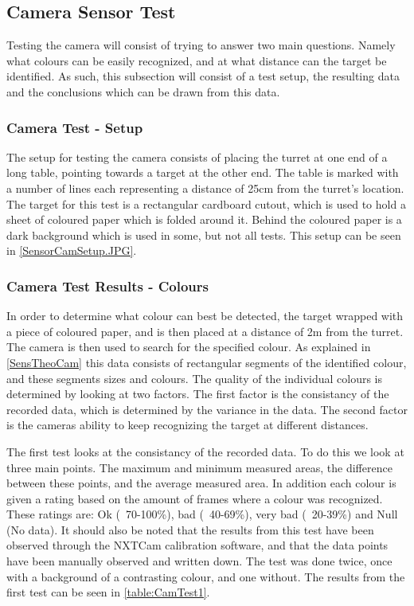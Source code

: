 \subsection{Camera Sensor Test}\label{CamTest}%
Testing the camera will consist of trying to answer two main questions. Namely
what colours can be easily recognized, and at what distance can the target be
identified. As such, this subsection will consist of a test setup, the resulting
data and the conclusions which can be drawn from this data.

\subsubsection{Camera Test - Setup}\label{CamTestSetup}
The setup for testing the camera consists of placing the turret at one end of a
long table, pointing towards a target at the other end. The table is marked with
a number of lines each representing a distance of 25cm from the turret's
location. The target for this test is a rectangular cardboard cutout, which is
used to hold a sheet of coloured paper which is folded around it. Behind the
coloured paper is a dark background which is used in some, but not all tests.
This setup can be seen in \autoref{SensorCamSetup.JPG}.


\subsubsection{Camera Test Results - Colours}\label{CamTestColours}
In order to determine what colour can best be detected, the target wrapped with
a piece of coloured paper, and is then placed at a distance of 2m from the
turret. The camera is then used to search for the specified colour. As explained
in \autoref{SensTheoCam} this data consists of rectangular segments of the
identified colour, and these segments sizes and colours. The quality of the
individual colours is determined by looking at two factors. The first factor is
the consistancy of the recorded data, which is determined by the variance in the
data. The second factor is the cameras ability to keep recognizing the target
at different distances.\nl

The first test looks at the consistancy of the recorded data. To do this we look
at three main points. The maximum and minimum measured areas, the difference
between these points, and the average measured area. In addition each colour is
given a rating based on the amount of frames where a colour was recognized.
These ratings are: Ok (~70-100\%), bad (~40-69\%), very bad (~20-39\%) and Null
(No data). It should also be noted that the results from this test have been
observed through the NXTCam calibration software, and that the data points have
been manually observed and written down. The test was done twice, once with a
background of a contrasting colour, and one without. The results from the first
test can be seen in \autoref{table:CamTest1}.

